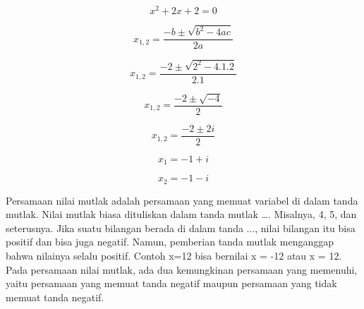 \begin{eulernotebook}
\begin{eulercomment}
\begin{eulercomment}
\begin{eulercomment}
\end{eulercomment}
\begin{eulerformula}
\[
x^2+2x+2=0
\]
\end{eulerformula}
\begin{eulerformula}
\[
x_{1,2} = \frac{-b\pm\sqrt{b^2-4ac}}{2a}
\]
\end{eulerformula}
\begin{eulerformula}
\[
x_{1,2} = \frac{-2\pm\sqrt{2^2-4.1.2}}{2.1}
\]
\end{eulerformula}
\begin{eulerformula}
\[
x_{1,2} = \frac{-2\pm\sqrt{-4}}{2}
\]
\end{eulerformula}
\begin{eulerformula}
\[
x_{1,2} = \frac{-2\pm 2i}{2}
\]
\end{eulerformula}
\begin{eulerformula}
\[
x_{1} = -1+i
\]
\end{eulerformula}
\begin{eulerformula}
\[
x_{2} = -1-i
\]
\end{eulerformula}
\begin{eulercomment}
Persamaan nilai mutlak adalah persamaan yang memuat variabel di dalam
tanda mutlak. Nilai mutlak biasa dituliskan dalam tanda mutlak \textbar{}…\textbar{}.
Misalnya, \textbar{}4\textbar{}, \textbar{}5\textbar{}, dan seterusnya. Jika suatu bilangan berada di
dalam tanda \textbar{}...\textbar{}, nilai bilangan itu bisa positif dan bisa juga
negatif. Namun, pemberian tanda mutlak menganggap bahwa nilainya
selalu positif. Contoh \textbar{}x\textbar{}=12 bisa bernilai x = -12 atau x = 12. Pada
persamaan nilai mutlak, ada dua kemungkinan persamaan yang memenuhi,
yaitu persamaan yang memuat tanda negatif maupun persamaan yang tidak
memuat tanda negatif.


\end{eulercomment}
\end{eulercomment}
\end{eulercomment}
\end{eulernotebook}
